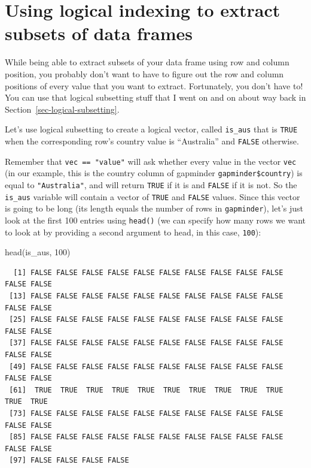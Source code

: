 \documentclass[
  letterpaper,
  DIV=11,
  numbers=noendperiod]{scrreprt}
\newenvironment{Shaded}{\begin{snugshade}}{\end{snugshade}}
\newcommand{\DecValTok}[1]{\textcolor[rgb]{0.68,0.00,0.00}{#1}}
\newcommand{\FunctionTok}[1]{\textcolor[rgb]{0.28,0.35,0.67}{#1}}
\newcommand{\NormalTok}[1]{\textcolor[rgb]{0.00,0.23,0.31}{#1}}
\newcommand{\OtherTok}[1]{\textcolor[rgb]{0.00,0.23,0.31}{#1}}
\newcommand{\SpecialCharTok}[1]{\textcolor[rgb]{0.37,0.37,0.37}{#1}}
\newcommand{\StringTok}[1]{\textcolor[rgb]{0.13,0.47,0.30}{#1}}
\begin{document}
\section{Using logical indexing to extract subsets of data
frames}\label{using-logical-indexing-to-extract-subsets-of-data-frames}

While being able to extract subsets of your data frame using row and
column position, you probably don't want to have to figure out the row
and column positions of every value that you want to extract.
Fortunately, you don't have to! You can use that logical subsetting
stuff that I went on and on about way back in
Section~\ref{sec-logical-subsetting}.

Let's use logical subsetting to create a logical vector, called
\texttt{is\_aus} that is \texttt{TRUE} when the corresponding row's
country value is ``Australia'' and \texttt{FALSE} otherwise.

\begin{Shaded}
\end{Shaded}

Remember that \texttt{vec\ ==\ "value"} will ask whether every value in
the vector \texttt{vec} (in our example, this is the country column of
gapminder \texttt{gapminder\$country}) is equal to \texttt{"Australia"},
and will return \texttt{TRUE} if it is and \texttt{FALSE} if it is not.
So the \texttt{is\_aus} variable will contain a vector of \texttt{TRUE}
and \texttt{FALSE} values. Since this vector is going to be long (its
length equals the number of rows in \texttt{gapminder}), let's just look
at the first 100 entries using \texttt{head()} (we can specify how many
rows we want to look at by providing a second argument to head, in this
case, \texttt{100}):

\begin{Shaded}
\begin{Highlighting}[]
\FunctionTok{head}\NormalTok{(is\_aus, }\DecValTok{100}\NormalTok{)}
\end{Highlighting}
\end{Shaded}

\begin{verbatim}
  [1] FALSE FALSE FALSE FALSE FALSE FALSE FALSE FALSE FALSE FALSE FALSE FALSE
 [13] FALSE FALSE FALSE FALSE FALSE FALSE FALSE FALSE FALSE FALSE FALSE FALSE
 [25] FALSE FALSE FALSE FALSE FALSE FALSE FALSE FALSE FALSE FALSE FALSE FALSE
 [37] FALSE FALSE FALSE FALSE FALSE FALSE FALSE FALSE FALSE FALSE FALSE FALSE
 [49] FALSE FALSE FALSE FALSE FALSE FALSE FALSE FALSE FALSE FALSE FALSE FALSE
 [61]  TRUE  TRUE  TRUE  TRUE  TRUE  TRUE  TRUE  TRUE  TRUE  TRUE  TRUE  TRUE
 [73] FALSE FALSE FALSE FALSE FALSE FALSE FALSE FALSE FALSE FALSE FALSE FALSE
 [85] FALSE FALSE FALSE FALSE FALSE FALSE FALSE FALSE FALSE FALSE FALSE FALSE
 [97] FALSE FALSE FALSE FALSE
\end{verbatim}
\end{document}
